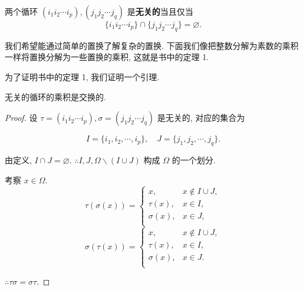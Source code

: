 \documentclass{ctexart}
\begin{document}
\begin{definition}
    两个循环 $(i_1i_2\cdots i_p),(j_1j_2\cdots j_q)$ 是\textbf{无关的}当且仅当
    \[\{i_1i_2\cdots i_p\}\cap\{j_1j_2\cdots j_q\}=\varnothing.\]
\end{definition}

我们希望能通过简单的置换了解复杂的置换. 下面我们像把整数分解为素数的乘积一样将置换分解为一些置换的乘积, 这就是书中的定理 1.

为了证明书中的定理 1, 我们证明一个引理.
\begin{lemma}\label{l1.3}
    无关的循环的乘积是交换的.
\end{lemma}
\begin{proof}
    设 $\tau=(i_1i_2\cdots i_p),\sigma=(j_1j_2\cdots j_q)$ 是无关的, 对应的集合为
    
    \[I=\{i_1,i_2,\cdots,i_p\},\quad J=\{j_1,j_2,\cdots,j_q\}.\]

    由定义, $I\cap J=\varnothing$. $\therefore I,J,\Omega\backslash(I\cup J)$ 构成 $\Omega$ 的一个划分.

    考察 $x\in\Omega$.
    \[\tau(\sigma(x))=\begin{cases}
        x, & x\notin I\cup J, \\
        \tau(x), & x\in I, \\
        \sigma(x), & x\in J, \\
    \end{cases}\]
    \[\sigma(\tau(x))=\begin{cases}
        x, & x\notin I\cup J, \\
        \tau(x), & x\in I, \\
        \sigma(x), & x\in J. \\
    \end{cases}\]
    
    $\therefore\tau\sigma=\sigma\tau$.
\end{proof}
\end{document}
